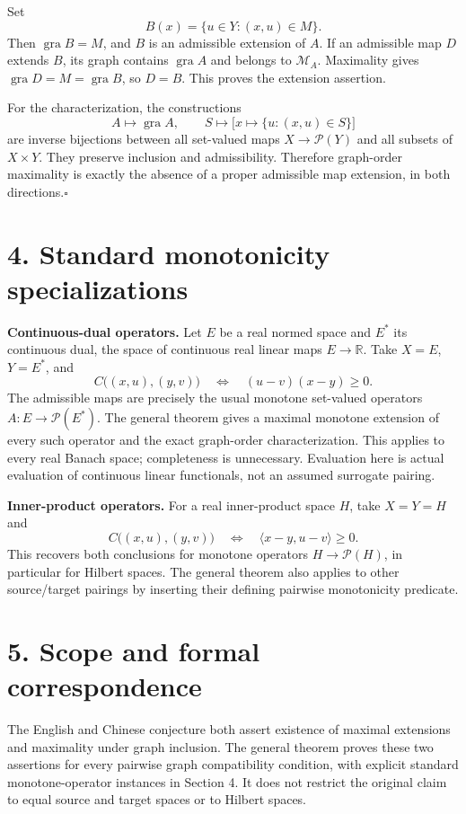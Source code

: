 \documentclass[11pt,a4paper]{article}
\newcommand{\gra}{\operatorname{gra}}
\begin{document}
Set
\[
  B(x)=\{u\in Y:(x,u)\in M\}.
\]
Then $\gra B=M$, and $B$ is an admissible extension of $A$.
If an admissible map $D$ extends $B$, its graph contains $\gra A$ and
belongs to $\mathcal M_A$. Maximality gives $\gra D=M=\gra B$, so $D=B$.
This proves the extension assertion.

For the characterization, the constructions
\[
  A\longmapsto\gra A,\qquad
  S\longmapsto\bigl[x\mapsto\{u:(x,u)\in S\}\bigr]
\]
are inverse bijections between all set-valued maps $X\to\mathcal P(Y)$
and all subsets of $X\times Y$. They preserve inclusion and
admissibility. Therefore graph-order maximality is exactly the absence
of a proper admissible map extension, in both directions.\hfill$\square$

\section*{4. Standard monotonicity specializations}
\textbf{Continuous-dual operators.} Let $E$ be a real normed space and
$E^*$ its continuous dual, the space of continuous real linear maps
$E\to\mathbb R$. Take $X=E$, $Y=E^*$, and
\[
  C\bigl((x,u),(y,v)\bigr)\quad\Longleftrightarrow\quad
  (u-v)(x-y)\geq0.
\]
The admissible maps are precisely the usual monotone set-valued
operators $A:E\to\mathcal P(E^*)$. The general theorem gives a maximal
monotone extension of every such operator and the exact graph-order
characterization. This applies to every real Banach space; completeness
is unnecessary. Evaluation here is actual evaluation of continuous
linear functionals, not an assumed surrogate pairing.

\textbf{Inner-product operators.} For a real inner-product space $H$,
take $X=Y=H$ and
\[
  C\bigl((x,u),(y,v)\bigr)\quad\Longleftrightarrow\quad
  \langle x-y,u-v\rangle\geq0.
\]
This recovers both conclusions for monotone operators
$H\to\mathcal P(H)$, in particular for Hilbert spaces.
The general theorem also applies to other source/target pairings by
inserting their defining pairwise monotonicity predicate.

\newpage
\section*{5. Scope and formal correspondence}
The English and Chinese conjecture both assert existence of maximal
extensions and maximality under graph inclusion. The general theorem
proves these two assertions for every pairwise graph compatibility
condition, with explicit standard monotone-operator instances in
Section 4. It does not restrict the original claim to equal source and
target spaces or to Hilbert spaces.
\end{document}

